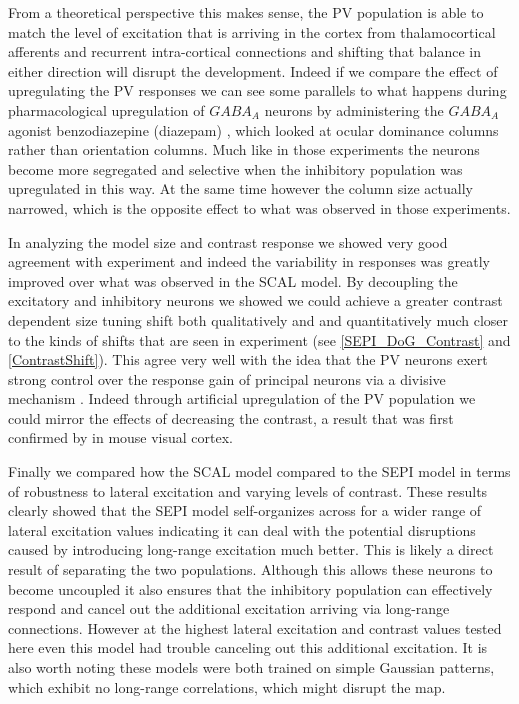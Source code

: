 From a theoretical perspective this makes sense, the PV population is
able to match the level of excitation that is arriving in the cortex
from thalamocortical afferents and recurrent intra-cortical
connections and shifting that balance in either direction will disrupt
the development. Indeed if we compare the effect of upregulating the
PV responses we can see some parallels to what happens during
pharmacological upregulation of $GABA_A$ neurons by administering the
$GABA_A$ agonist benzodiazepine (diazepam)
\citep{Fagiolini2004,Hensch2004}, which looked at ocular dominance
columns rather than orientation columns. Much like in those
experiments the neurons become more segregated and selective when the
inhibitory population was upregulated in this way. At the same time
however the column size actually narrowed, which is the opposite
effect to what was observed in those experiments.

In analyzing the model size and contrast response we showed very good
agreement with experiment and indeed the variability in responses was
greatly improved over what was observed in the SCAL model. By
decoupling the excitatory and inhibitory neurons we showed we could
achieve a greater contrast dependent size tuning shift both
qualitatively and and quantitatively much closer to the kinds of
shifts that are seen in experiment (see \ref{SEPI_DoG_Contrast} and
\ref{ContrastShift}). This agree very well with the idea that the PV
neurons exert strong control over the response gain of principal
neurons via a divisive mechanism \citep{Wilson2012}. Indeed through
artificial upregulation of the PV population we could mirror the
effects of decreasing the contrast, a result that was first confirmed
by \citep{Nienborg2013} in mouse visual cortex.

Finally we compared how the SCAL model compared to the SEPI model in
terms of robustness to lateral excitation and varying levels of
contrast. These results clearly showed that the SEPI model
self-organizes across for a wider range of lateral excitation values
indicating it can deal with the potential disruptions caused by
introducing long-range excitation much better. This is likely a direct
result of separating the two populations. Although this allows these
neurons to become uncoupled it also ensures that the inhibitory
population can effectively respond and cancel out the additional
excitation arriving via long-range connections. However at the highest
lateral excitation and contrast values tested here even this model had
trouble canceling out this additional excitation. It is also worth
noting these models were both trained on simple Gaussian patterns,
which exhibit no long-range correlations, which might disrupt the map.


